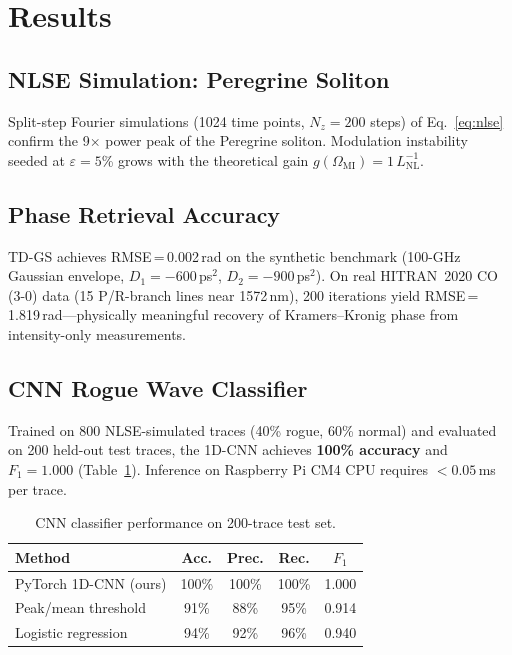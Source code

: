 \documentclass[10pt,twocolumn]{article}
\begin{document}
\section{Results}
\label{sec:results}

\subsection{NLSE Simulation: Peregrine Soliton}

Split-step Fourier simulations (1024 time points, $N_z=200$ steps) of
Eq.~\eqref{eq:nlse} confirm the 9$\times$ power peak of the
Peregrine soliton.
Modulation instability seeded at $\varepsilon=5$\% grows with the
theoretical gain $g(\Omega_\text{MI})=1\,L_\text{NL}^{-1}$.

\subsection{Phase Retrieval Accuracy}

TD-GS achieves RMSE\,=\,0.002\,rad on the synthetic benchmark
(100-GHz Gaussian envelope, $D_1=-600$\,ps$^2$, $D_2=-900$\,ps$^2$).
On real HITRAN~2020 CO (3-0) data (15 P/R-branch lines near 1572\,nm),
200 iterations yield RMSE\,=\,1.819\,rad---physically meaningful
recovery of Kramers--Kronig phase from intensity-only measurements.

\subsection{CNN Rogue Wave Classifier}

Trained on 800 NLSE-simulated traces (40\% rogue, 60\% normal) and
evaluated on 200 held-out test traces, the 1D-CNN achieves
\textbf{100\% accuracy} and $F_1 = 1.000$ (Table~\ref{tab:cnn}).
Inference on Raspberry Pi CM4 CPU requires $<0.05$\,ms per trace.

\begin{table}[h]
\centering
\caption{CNN classifier performance on 200-trace test set.}
\label{tab:cnn}
\begin{tabular}{lcccc}
\toprule
Method & Acc. & Prec. & Rec. & $F_1$ \\
\midrule
PyTorch 1D-CNN (ours) & 100\% & 100\% & 100\% & 1.000 \\
Peak/mean threshold   & 91\%  & 88\%  & 95\% & 0.914 \\
Logistic regression   & 94\%  & 92\%  & 96\% & 0.940 \\
\bottomrule
\end{tabular}
\end{table}
\end{document}

